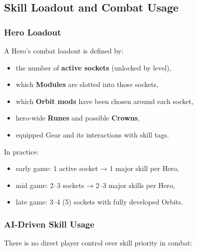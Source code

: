 \vspace{1em}


\subsection{Skill Loadout and Combat Usage}

\subsubsection*{Hero Loadout}

A Hero's combat loadout is defined by:

\begin{itemize}
	\item the number of \textbf{active sockets} (unlocked by level),
	\item which \textbf{Modules} are slotted into those sockets,
	\item which \textbf{Orbit mods} have been chosen around each socket,
	\item hero-wide \textbf{Runes} and possible \textbf{Crowns},
	\item equipped Gear and its interactions with skill tags.
\end{itemize}

In practice:

\begin{itemize}
	\item early game: 1 active socket → 1 major skill per Hero,
	\item mid game: 2--3 sockets → 2--3 major skills per Hero,
	\item late game: 3--4 (5) sockets with fully developed Orbits.
\end{itemize}

\subsubsection*{AI-Driven Skill Usage}

There is no direct player control over skill priority in combat:

